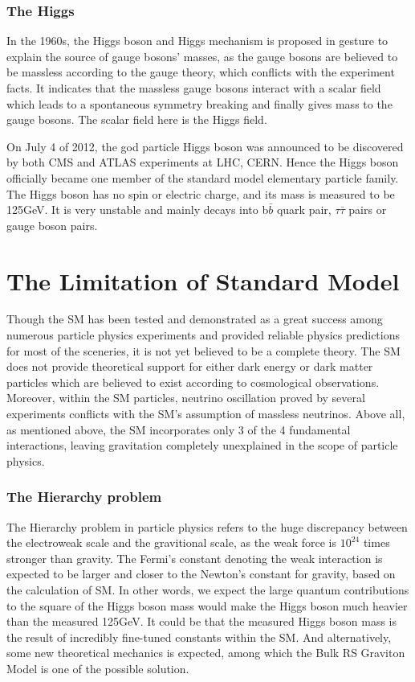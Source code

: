 \subsubsection{The Higgs}
In the 1960s, the Higgs boson and Higgs mechanism is proposed in gesture to explain the source of gauge bosons' masses\cite{higgstheory1,higgstheory2,higgstheory3}, as the gauge bosons are believed to be massless according to the gauge theory, which conflicts with the experiment facts. It indicates that the massless gauge bosons interact with a scalar field which leads to a spontaneous symmetry breaking and finally gives mass to the gauge bosons. The scalar field here is the Higgs field. 

\vspace{0.3cm}
On July 4 of 2012, the god particle Higgs boson was announced to be discovered by both CMS and ATLAS experiments at LHC, CERN\cite{higgsdiscover1,higgsdiscover2}. Hence the Higgs boson officially became one member of the standard model elementary particle family. The Higgs boson has no spin or electric charge, and its mass is measured to be 125GeV. It is very unstable and mainly decays into b$\bar{b}$ quark pair, $\tau\bar{\tau}$ pairs or gauge boson pairs.

\section{The Limitation of Standard Model}
Though the SM has been tested and demonstrated as a great success among numerous particle physics experiments and provided reliable physics predictions for most of the sceneries, it is not yet believed to be a complete theory. The SM does not provide theoretical support for either dark energy or dark matter particles which are believed to exist according to cosmological observations. Moreover, within the SM particles, neutrino oscillation proved by several experiments conflicts with the SM's assumption of massless neutrinos. Above all, as mentioned above, the SM incorporates only 3 of the 4 fundamental interactions, leaving gravitation completely unexplained in the scope of particle physics.
\subsubsection{The Hierarchy problem}
The Hierarchy problem in particle physics refers to the huge discrepancy between the electroweak scale and the gravitional scale, as the weak force is $10^{24}$ times stronger than gravity. The Fermi's constant denoting the weak interaction is expected to be larger and closer to the Newton's constant for gravity, based on the calculation of SM. In other words, we expect the large quantum contributions to the square of the Higgs boson mass would make the Higgs boson much heavier than the measured 125GeV. It could be that the measured Higgs boson mass is the result of incredibly fine-tuned constants within the SM. And alternatively, some new theoretical mechanics is expected, among which the Bulk RS Graviton Model is one of the possible solution.

